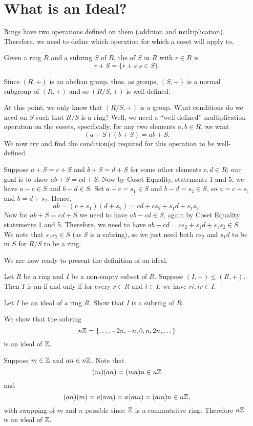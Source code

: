 \section{What is an Ideal?}
Rings have two operations defined on them (addition and multiplication). Therefore, we need to define which operation for which a coset will apply to.
\begin{definition}
    Given a ring $R$ and a subring $S$ of $R$, the  of $S$ in $R$ with  $r \in R$ is
    \[
        r + S = \{r+s \vert s \in S\}.
    \]
\end{definition}
\begin{remark}
    Since $(R,+)$ is an abelian group, thus, as groups, $(S,+)$ is a normal subgroup of $(R,+)$ and so $(R/S,+)$ is well-defined.
\end{remark}

At this point, we only know that $(R/S,+)$ is a group. What conditions do we need on $S$ such that $R/S$ is a ring? Well, we need a ``well-defined'' multiplication operation on the cosets, specifically, for any two elements $a, b \in R$, we want
\[
    (a+S)(b+S) = ab + S.
\]
We now try and find the condition(s) required for this operation to be well-defined.

Suppose $a+S = c+S$ and $b+S = d+S$ for some other elements $c, d \in R$; our goal is to show $ab+S = cd+S$. Now by Coset Equality, statements 1 and 5, we have $a-c \in S$ and $b-d \in S$. Set $a-c = s_1 \in S$ and $b-d = s_2 \in S$, so $a = c+s_1$ and $b = d+s_2$. Hence,
\[
    ab = (c+s_1)(d+s_2) = cd + cs_2 + s_1d + s_1s_2.
\]
Now for $ab + S = cd+S$ we need to have $ab-cd \in S$, again by Coset Equality statements 1 and 5. Therefore, we need to have $ab-cd = cs_2+s_1d+s_1s_2 \in S$. We note that $s_1s_2 \in S$ (as $S$ is a subring), so we just need both $cs_2$ and $s_1d$ to be in $S$ for $R/S$ to be a ring.

We are now ready to present the definition of an ideal.
\begin{definition}
    Let $R$ be a ring and $I$ be a non-empty subset of $R$. Suppose $(I,+) \leq (R,+)$. Then $I$ is an  if and only if for every $r \in R$ and $i \in I$, we have $ri, ir \in I$.
\end{definition}
\begin{exercise}\label{exercise-ideal-is-a-subring}
    Let $I$ be an ideal of a ring $R$. Show that $I$ is a subring of $R$.
\end{exercise}
\begin{example}\label{example-nZ-ideal-of-Z}
    We show that the subring
    \[
        n\mathbb{Z} = \{\dots, -2n, -n, 0, n, 2n, \dots\}
    \]
    is an ideal of $\mathbb{Z}$.

    Suppose $m \in \mathbb{Z}$ and $an \in n\mathbb{Z}$.  Note that
    \[
        (m)(an) = (ma)n \in n\mathbb{Z}
    \]
    and
    \[
        (an)(m) = a(nm) = a(mn) = (am)n \in n\mathbb{Z},
    \]
    with swapping of $m$ and $n$ possible since $\mathbb{Z}$ is a commutative ring. Therefore $n\mathbb{Z}$ is an ideal of $\mathbb{Z}$.
\end{example}

